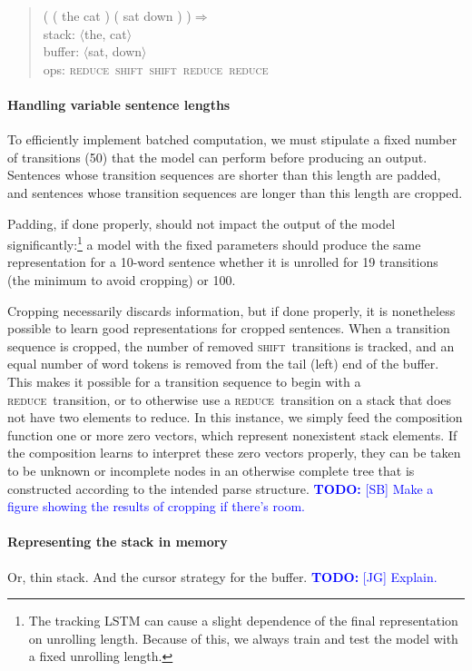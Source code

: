 \documentclass[11pt,letterpaper]{article}
\newcommand\todo[1]{\textcolor{blue}{\textbf{TODO:} #1}}
\newcommand{\shift}{\textsc{shift}}
\newcommand{\reduce}{\textsc{reduce}}
\begin{document}
\begin{quote}\small
( ( the cat ) ( sat down ) )$\Rightarrow$ \\
stack: $\langle$the, cat$\rangle$\\
buffer: $\langle$sat, down$\rangle$\\
ops: \reduce~\shift~\shift~\reduce~\reduce
\end{quote}

\paragraph{Handling variable sentence lengths}

To efficiently implement batched computation, we must stipulate a fixed number of transitions (50) that the model can perform before producing an output. Sentences whose transition sequences are shorter than this length are padded, and sentences whose transition sequences are longer than this length are cropped. 

Padding, if done properly, should not impact the output of the model significantly:\footnote{The tracking LSTM can cause a slight dependence of the final representation on unrolling length. Because of this, we always train and test the model with a fixed unrolling length.} a model with the fixed parameters should produce the same representation for a 10-word sentence whether it is unrolled for 19 transitions (the minimum to avoid cropping) or 100.

Cropping necessarily discards information, but if done properly, it is nonetheless possible to learn good representations for cropped sentences. When a transition sequence is cropped, the number of removed \shift~transitions is tracked, and an equal number of word tokens is removed from the tail (left) end of the buffer. This makes it possible for a transition sequence to begin with a \reduce~transition, or to otherwise use a \reduce~transition on a stack that does not have two elements to reduce. In this instance, we simply feed the composition function one or more zero vectors, which represent nonexistent stack elements. If the composition learns to interpret these zero vectors properly, they can be taken to be unknown or incomplete nodes in an otherwise complete tree that is constructed according to the intended parse structure. \todo{[SB] Make a figure showing the results of cropping if there's room.}

\paragraph{Representing the stack in memory} Or, thin stack. And the cursor strategy for the buffer. 
\todo{[JG] Explain.}
\end{document}
